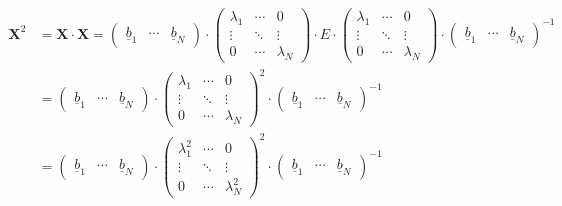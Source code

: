 \begin{equation}\label{eq:thirteenonehundredtwentynine}
\begin{split}
\mathbf{X}^{2} & = \mathbf{X}\cdot \mathbf{X}=\left(\begin{array}{ccc} {\underline{b}_{1} } & {\cdots } & {\underline{b}_{N} } \end{array}\right)\cdot \left(\begin{array}{ccc} {\lambda _{1} } & {\cdots } & {0} \\ {\vdots } & {\ddots } & {\vdots } \\ {0} & {\cdots } & {\lambda _{N} } \end{array}\right)\cdot E\cdot \left(\begin{array}{ccc} {\lambda _{1} } & {\cdots } & {0} \\ {\vdots } & {\ddots } & {\vdots } \\ {0} & {\cdots } & {\lambda _{N} } \end{array}\right)\cdot \left(\begin{array}{ccc} {\underline{b}_{1} } & {\cdots } & {\underline{b}_{N} } \end{array}\right)^{-1} \\
& = \left(\begin{array}{ccc} {\underline{b}_{1} } & {\cdots } & {\underline{b}_{N} } \end{array}\right)\cdot \left(\begin{array}{ccc} {\lambda _{1} } & {\cdots } & {0} \\ {\vdots } & {\ddots } & {\vdots } \\ {0} & {\cdots } & {\lambda _{N} } \end{array}\right)^{2}\cdot \left(\begin{array}{ccc} {\underline{b}_{1} } & {\cdots } & {\underline{b}_{N} } \end{array}\right)^{-1}\\
& = \left(\begin{array}{ccc} {\underline{b}_{1} } & {\cdots } & {\underline{b}_{N} } \end{array}\right)\cdot \left(\begin{array}{ccc} {\lambda _{1}^{2} } & {\cdots } & {0} \\ {\vdots } & {\ddots } & {\vdots } \\ {0} & {\cdots } & {\lambda _{N}^{2} } \end{array}\right)^{2}\cdot \left(\begin{array}{ccc} {\underline{b}_{1} } & {\cdots } & {\underline{b}_{N} } \end{array}\right)^{-1}
\end{split}
\end{equation}

